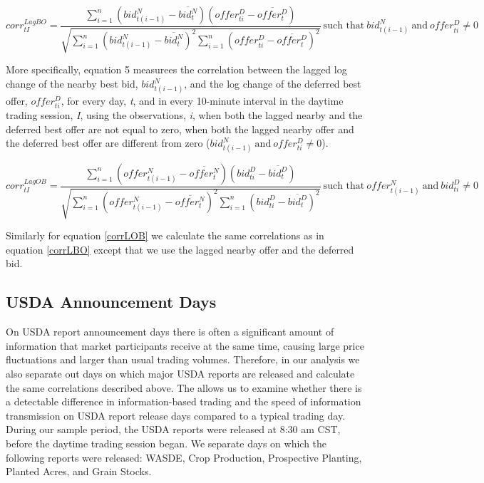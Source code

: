 \documentclass[]{elsarticle} %
\begin{document}
\begin{equation} \label{corrLBO}
corr^{LagBO}_{tI} = \frac{\sum\limits_{i=1}^{n} \left(bid_{t(i-1)}^N - \overline{bid_t^N}\right) \left(offer_{ti}^D - \overline{offer_t^D}\right)}{\sqrt{\sum\limits_{i=1}^{n} \left(bid_{t(i-1)}^N - \overline{bid_t^N}\right)^2 \sum\limits_{i=1}^{n}\left(offer_{ti}^D - \overline{offer_t^D}\right)^2}} \: \textrm{such that} \: {bid_{t(i-1)}^N \: \textrm{and} \: offer_{ti}^D} \neq 0
\end{equation}

More specifically, equation 5 measurees the correlation between the
lagged log change of the nearby best bid, \(bid_{t(i-1)}^N\), and the
log change of the deferred best offer, \(offer_{ti}^D\), for every day,
\emph{t}, and in every 10-minute interval in the daytime trading
session, \emph{I}, using the observations, \emph{i}, when both the
lagged nearby and the deferred best offer are not equal to zero, when
both the lagged nearby offer and the deferred best offer are different
from zero (\({bid_{t(i-1)}^N \: \textrm{and} \: offer_{ti}^D} \neq 0\)).

\begin{equation} \label{corrLOB}
corr^{LagOB}_{tI} = \frac{\sum\limits_{i=1}^{n} \left(offer_{t(i-1)}^N - \overline{offer_t^N}\right) \left(bid_{ti}^D - \overline{bid_t^D}\right)}{\sqrt{\sum\limits_{i=1}^{n} \left(offer_{t(i-1)}^N - \overline{offer_t^N}\right)^2 \sum\limits_{i=1}^{n}\left(bid_{ti}^D - \overline{bid_t^D}\right)^2}} \: \textrm{such that} \: {offer_{t(i-1)}^N \: \textrm{and} \: bid_{ti}^D} \neq 0
\end{equation}

Similarly for equation \ref{corrLOB} we calculate the same correlations
as in equation \ref{corrLBO} except that we use the lagged nearby offer
and the deferred bid.

\subsection{USDA Announcement Days}\label{usda-announcement-days}

On USDA report announcement days there is often a significant amount of
information that market participants receive at the same time, causing
large price fluctuations and larger than usual trading volumes.
Therefore, in our analysis we also separate out days on which major USDA
reports are released and calculate the same correlations described
above. The allows us to examine whether there is a detectable difference
in information-based trading and the speed of information transmission
on USDA report release days compared to a typical trading day. During
our sample period, the USDA reports were released at 8:30 am CST, before
the daytime trading session began. We separate days on which the
following reports were released: WASDE, Crop Production, Prospective
Planting, Planted Acres, and Grain Stocks.
\end{document}
